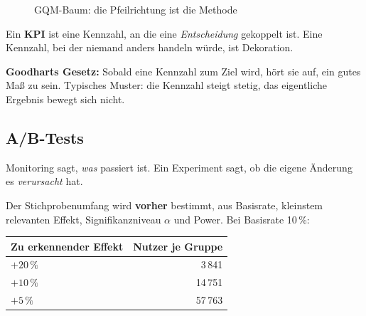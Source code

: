 \documentclass[12pt, a4paper]{article}
\begin{document}
\begin{figure}[H]
\centering
{}
\caption{GQM-Baum: die Pfeilrichtung ist die Methode}
\end{figure}

Ein \textbf{KPI} ist eine Kennzahl, an die eine \emph{Entscheidung} gekoppelt ist.
Eine Kennzahl, bei der niemand anders handeln würde, ist Dekoration.

\begin{notebox}
\textbf{Goodharts Gesetz:} Sobald eine Kennzahl zum Ziel wird, hört sie auf, ein gutes
Maß zu sein. Typisches Muster: die Kennzahl steigt stetig, das eigentliche Ergebnis
bewegt sich nicht.
\end{notebox}

\subsection{A/B-Tests}

Monitoring sagt, \emph{was} passiert ist. Ein Experiment sagt, ob die eigene Änderung
es \emph{verursacht} hat.

Der Stichprobenumfang wird \textbf{vorher} bestimmt, aus Basisrate, kleinstem
relevanten Effekt, Signifikanzniveau $\alpha$ und Power. Bei Basisrate 10\,\%:

\begin{center}
\begin{tabular}{lr}
\hline
\textbf{Zu erkennender Effekt} & \textbf{Nutzer je Gruppe} \\
\hline
$+20\,\%$ & 3\,841 \\
$+10\,\%$ & 14\,751 \\
$+5\,\%$  & 57\,763 \\
\hline
\end{tabular}
\end{center}
\end{document}
